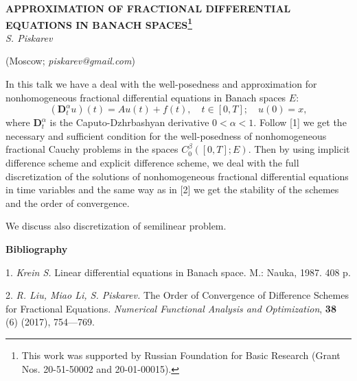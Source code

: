 
\begin{center}
    {\bf APPROXIMATION OF FRACTIONAL DIFFERENTIAL EQUATIONS IN BANACH SPACES\footnote{This work was supported by Russian Foundation for Basic Research
(Grant Nos. 20-51-50002 and 20-01-00015).}}\\

    {\it S. Piskarev}

    (Moscow; {\it piskarev@gmail.com})
\end{center}


In this talk we have a deal with the well-posedness and approximation for nonhomogeneous
 fractional differential equations in Banach spaces $E$:
 $$ (\mathbf{D}_{t}^{\alpha} u)(t) = A u(t) + f (t), \quad t \in [0,T];\quad
u(0)=x, $$
where $\mathbf{D}_{t}^{\alpha}$ is the Caputo-Dzhrbashyan derivative $0 < \alpha < 1.$
Follow [1] we get the necessary and sufficient condition for the well-posedness of
nonhomogeneous fractional Cauchy problems in the spaces $C_0^\beta([0,T];E)$.
Then by using implicit difference scheme and explicit difference scheme, we
deal with the full discretization of the solutions of nonhomogeneous
fractional differential equations in time variables and the same way as in [2] we
get the stability of the schemes and the order of convergence.

We discuss also discretization of semilinear problem.


\smallskip \centerline {\bf Bibliography} \nopagebreak

1. {\it Krein S.} Linear differential equations in Banach space. M.: Nauka, 1987. 408 p.

2. {\it R. Liu, Miao Li, S. Piskarev.} The Order of Convergence of Difference Schemes for
Fractional Equations. {\em Numerical Functional Analysis and Optimization}, {\bf 38} (6)
(2017), 754---769.
